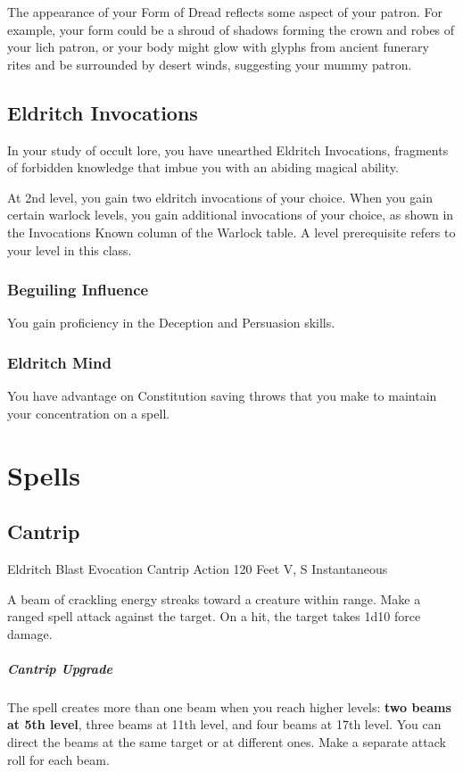 \documentclass[letterpaper,openany,oneside,twocolumn]{book}
\begin{document}
The appearance of your Form of Dread reflects some aspect of your patron. For example, your form could be a shroud of shadows forming the crown and robes of your lich patron, or your body might glow with glyphs from ancient funerary rites and be surrounded by desert winds, suggesting your mummy patron.
\subsection*{Eldritch Invocations}
In your study of occult lore, you have unearthed Eldritch Invocations, fragments of forbidden knowledge that imbue you with an abiding magical ability.

At 2nd level, you gain two eldritch invocations of your choice. When you gain certain warlock levels, you gain additional invocations of your choice, as shown in the Invocations Known column of the Warlock table. A level prerequisite refers to your level in this class.
\subsubsection*{Beguiling Influence}
You gain proficiency in the Deception and Persuasion skills.
\subsubsection*{Eldritch Mind}
You have advantage on Constitution saving throws that you make to maintain your concentration on a spell.

\section*{Spells}
\subsection*{Cantrip}

\DndSpellHeader
  {Eldritch Blast}
  {Evocation Cantrip}
  {Action}
  {120 Feet}
  {V, S}
  {Instantaneous}

A beam of crackling energy streaks toward a creature within range. Make a ranged spell attack against the target. On a hit, the target takes 1d10 force damage.

\subparagraph*{Cantrip Upgrade} The spell creates more than one beam when you reach higher levels: \textbf{two beams at 5th level}, three beams at 11th level, and four beams at 17th level. You can direct the beams at the same target or at different ones. Make a separate attack roll for each beam.
\end{document}
